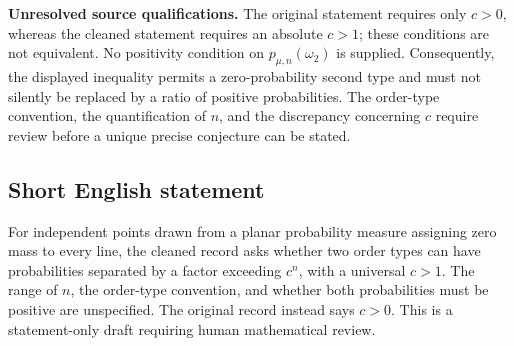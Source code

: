 \documentclass[11pt]{article}
\begin{document}
\textbf{Unresolved source qualifications.} The original statement requires only \(c>0\), whereas the cleaned statement requires an absolute \(c>1\); these conditions are not equivalent. No positivity condition on \(p_{\mu,n}(\omega_2)\) is supplied. Consequently, the displayed inequality permits a zero-probability second type and must not silently be replaced by a ratio of positive probabilities. The order-type convention, the quantification of \(n\), and the discrepancy concerning \(c\) require review before a unique precise conjecture can be stated.
\subsection{Short English statement}
For independent points drawn from a planar probability measure assigning zero mass to every line, the cleaned record asks whether two order types can have probabilities separated by a factor exceeding \(c^n\), with a universal \(c>1\). The range of \(n\), the order-type convention, and whether both probabilities must be positive are unspecified. The original record instead says \(c>0\). This is a statement-only draft requiring human mathematical review.
\end{document}
